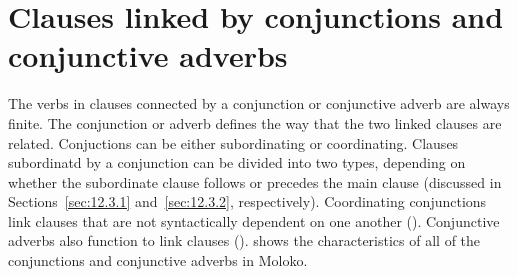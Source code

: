 \section{Clauses linked by conjunctions and conjunctive adverbs}\label{sec:12.3}
\hypertarget{RefHeading1213421525720847}{}
The verbs in clauses connected by a conjunction or conjunctive adverb are always finite. The conjunction or adverb defines the way that the two linked clauses are related. Conjuctions can be either subordinating or coordinating. Clauses subordinatd by a conjunction can be divided into two types, depending on whether the subordinate clause follows or precedes the main clause (discussed in Sections~\ref{sec:12.3.1} and~\ref{sec:12.3.2}, respectively). Coordinating conjunctions link clauses that are not syntactically dependent on one another (). Conjunctive adverbs also function to link clauses ().  shows the characteristics of all of the conjunctions and conjunctive adverbs in Moloko.

